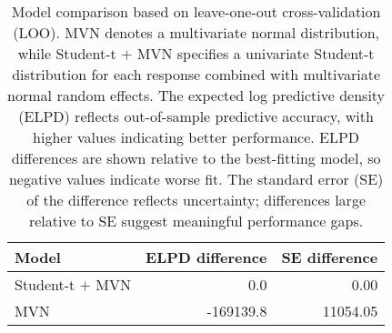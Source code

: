 \begin{table}

\caption{\label{tab:tab:elpd}Model comparison based on leave-one-out cross-validation (LOO).  MVN denotes a multivariate normal distribution, while Student-t $+$ MVN specifies a univariate Student-t distribution for each response combined with multivariate normal random effects.
  The expected log predictive density (ELPD) reflects out-of-sample predictive accuracy, with higher values indicating better performance. ELPD differences are shown relative to the best-fitting model, so negative values indicate worse fit. The standard error (SE) of the difference reflects uncertainty; differences large relative to SE suggest meaningful performance gaps.}
\centering
\begin{tabular}[t]{lrr}
\toprule
Model & ELPD difference & SE difference\\
\midrule
Student-t $+$ MVN & 0.0 & 0.00\\
MVN & -169139.8 & 11054.05\\
\bottomrule
\end{tabular}
\end{table}
